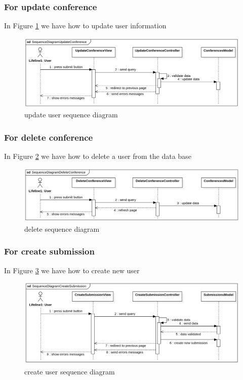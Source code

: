 \documentclass[12pt,a4paper]{article}
\begin{document}
		\subsubsection{For update conference}
		In Figure \ref{fig:conference-update-s-d} we have how to update user information
		
			\begin{figure}[b]
				\centering
				\includegraphics[width=\textwidth]{diagrams/conference_update_sequence.png}
				\caption{update user sequence diagram}
				\label{fig:conference-update-s-d}
			\end{figure}
		
		\subsubsection{For delete conference}
		In Figure \ref{fig:conference-delete-s-d} we have how to delete a user from the data base
		
			\begin{figure}[b]
				\centering
				\includegraphics[width=\textwidth]{diagrams/conference_delete_sequence.png}
				\caption{delete sequence diagram}
				\label{fig:conference-delete-s-d}
			\end{figure}
		
		\subsubsection{For create submission}
		In Figure \ref{fig:submission-create-s-d} we have how to create new user
		
			\begin{figure}[b]
				\centering
				\includegraphics[width=\textwidth]{diagrams/submission_create_sequence.png}
				\caption{create user sequence diagram}
				\label{fig:submission-create-s-d}
			\end{figure}
		
\end{document}
